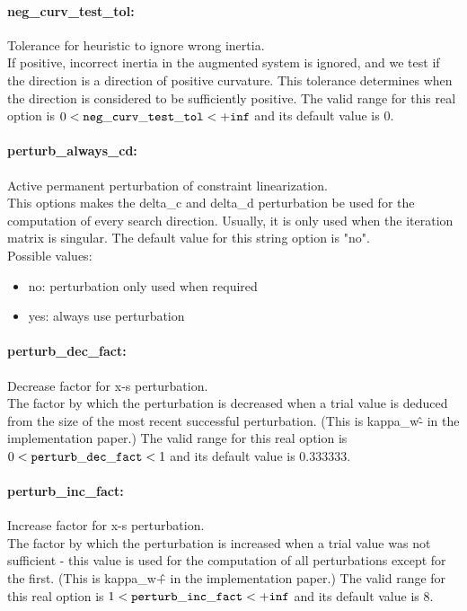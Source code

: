\paragraph{neg\_curv\_test\_tol:}\label{sec:neg_curv_test_tol} Tolerance for heuristic to ignore wrong inertia. $\;$ \\
 If positive, incorrect inertia in the augmented
system is ignored, and we test if the direction
is a direction of positive curvature.  This
tolerance determines when the direction is
considered to be sufficiently positive. The valid range for this real option is 
$0 <  {\tt neg\_curv\_test\_tol } <  {\tt +inf}$
and its default value is $0$.


\paragraph{perturb\_always\_cd:}\label{sec:perturb_always_cd} Active permanent perturbation of constraint linearization. $\;$ \\
 This options makes the delta\_c and delta\_d
perturbation be used for the computation of every
search direction.  Usually, it is only used when
the iteration matrix is singular.
The default value for this string option is "no".
\\ 
Possible values:
\begin{itemize}
   \item no: perturbation only used when required
   \item yes: always use perturbation
\end{itemize}

\paragraph{perturb\_dec\_fact:}\label{sec:perturb_dec_fact} Decrease factor for x-s perturbation. $\;$ \\
 The factor by which the perturbation is decreased
when a trial value is deduced from the size of
the most recent successful perturbation. (This is
kappa\_w\^- in the implementation paper.) The valid range for this real option is 
$0 <  {\tt perturb\_dec\_fact } <  1$
and its default value is $0.333333$.


\paragraph{perturb\_inc\_fact:}\label{sec:perturb_inc_fact} Increase factor for x-s perturbation. $\;$ \\
 The factor by which the perturbation is increased
when a trial value was not sufficient - this
value is used for the computation of all
perturbations except for the first. (This is
kappa\_w\^+ in the implementation paper.) The valid range for this real option is 
$1 <  {\tt perturb\_inc\_fact } <  {\tt +inf}$
and its default value is $8$.



